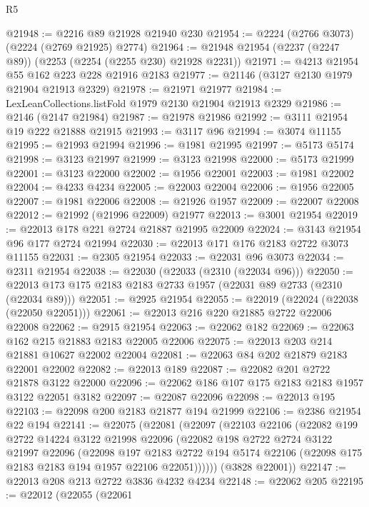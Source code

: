 \begin{lexlean}{R5}
\begin{coremodule}
@21948 := @2216 @89 @21928 @21940 @230
@21954 := @2224 (@2766 @3073) (@2224 (@2769 @21925) @2774)
@21964 := @21948 @21954 (@2237 (@2247 @89)) (@2253 (@2254 (@2255 @230) @21928 @2231))
@21971 := @4213 @21954 @55 @162 @223 @228 @21916 @2183
@21977 := @21146 (@3127 @2130 @1979 @21904 @21913 @2329)
@21978 := @21971 @21977
@21984 := LexLeanCollections.listFold @1979 @2130 @21904 @21913 @2329
@21986 := @2146 (@2147 @21984)
@21987 := @21978 @21986
@21992 := @3111 @21954 @19 @222 @21888 @21915
@21993 := @3117 @96
@21994 := @3074 @11155
@21995 := @21993 @21994
@21996 := @1981 @21995
@21997 := @5173 @5174
@21998 := @3123 @21997
@21999 := @3123 @21998
@22000 := @5173 @21999
@22001 := @3123 @22000
@22002 := @1956 @22001
@22003 := @1981 @22002
@22004 := @4233 @4234
@22005 := @22003 @22004
@22006 := @1956 @22005
@22007 := @1981 @22006
@22008 := @21926 @1957
@22009 := @22007 @22008
@22012 := @21992 (@21996 @22009) @21977
@22013 := @3001 @21954
@22019 := @22013 @178 @221 @2724 @21887 @21995 @22009
@22024 := @3143 @21954 @96 @177 @2724 @21994
@22030 := @22013 @171 @176 @2183 @2722 @3073 @11155
@22031 := @2305 @21954
@22033 := @22031 @96 @3073
@22034 := @2311 @21954
@22038 := @22030 (@22033 (@2310 (@22034 @96)))
@22050 := @22013 @173 @175 @2183 @2183 @2733 @1957 (@22031 @89 @2733 (@2310 (@22034 @89)))
@22051 := @2925 @21954
@22055 := @22019 (@22024 (@22038 (@22050 @22051)))
@22061 := @22013 @216 @220 @21885 @2722 @22006 @22008
@22062 := @2915 @21954
@22063 := @22062 @182
@22069 := @22063 @162 @215 @21883 @2183 @22005 @22006
@22075 := @22013 @203 @214 @21881 @10627 @22002 @22004
@22081 := @22063 @84 @202 @21879 @2183 @22001 @22002
@22082 := @22013 @189
@22087 := @22082 @201 @2722 @21878 @3122 @22000
@22096 := @22062 @186 @107 @175 @2183 @2183 @1957 @3122 @22051 @3182
@22097 := @22087 @22096
@22098 := @22013 @195
@22103 := @22098 @200 @2183 @21877 @194 @21999
@22106 := @2386 @21954 @22 @194
@22141 := @22075
    (@22081
      (@22097
        (@22103
          @22106
          (@22082
            @199
            @2722
            @14224
            @3122
            @21998
            @22096
            (@22082
              @198
              @2722
              @2724
              @3122
              @21997
              @22096
              (@22098
                @197
                @2183
                @2722
                @194
                @5174
                @22106
                (@22098 @175 @2183 @2183 @194 @1957 @22106 @22051))))))
      (@3828 @22001))
@22147 := @22013 @208 @213 @2722 @3836 @4232 @4234
@22148 := @22062 @205
@22195 := @22012
    (@22055
      (@22061

\end{coremodule}
\end{lexlean}
